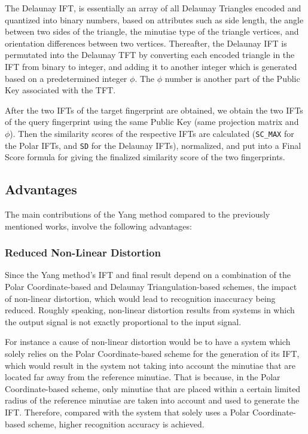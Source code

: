 \documentclass[fyp]{socreport}
\begin{document}
The Delaunay IFT, is essentially an array of all Delaunay Triangles encoded and quantized into binary numbers, based on attributes such as side length, the angle between two sides of the triangle, the minutiae type of the triangle vertices, and orientation differences between two vertices. Thereafter, the Delaunay IFT is permutated into the Delaunay TFT by converting each encoded triangle in the IFT from binary to integer, and adding it to another integer which is generated based on a predetermined integer $\phi$. The $\phi$ number is another part of the Public Key associated with the TFT.

After the two IFTs of the target fingerprint are obtained, we obtain the two IFTs of the query fingerprint using the same Public Key (same projection matrix and $\phi$). Then the similarity scores of the respective IFTs are calculated (\texttt{SC\_MAX} for the Polar IFTs, and \texttt{SD} for the Delaunay IFTs), normalized, and put into a Final Score formula for giving the finalized similarity score of the two fingerprints.

\subsection{Advantages}
The main contributions of the Yang method compared to the previously mentioned works, involve the following advantages:

\subsubsection{Reduced Non-Linear Distortion}
Since the Yang method's IFT and final result depend on a combination of the Polar Coordinate-based and Delaunay Triangulation-based schemes, the impact of non-linear distortion, which would lead to recognition inaccuracy being reduced. Roughly speaking, non-linear distortion results from systems in which the output signal is not exactly proportional to the input signal. 

For instance a cause of non-linear distortion would be to have a system which solely relies on the Polar Coordinate-based scheme for the generation of its IFT, which would result in the system not taking into account the minutiae that are located far away from the reference minutiae. That is because, in the Polar Coordinate-based scheme, only minutiae that are placed within a certain limited radius of the reference minutiae are taken into account and used to generate the IFT. Therefore, compared with the system that solely uses a Polar Coordinate-based scheme, higher recognition accuracy is achieved.
\end{document}
